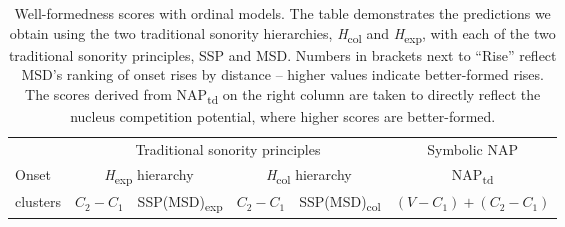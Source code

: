 \begin{sidewaystable}
\caption{\label{tab:ordinalscores} Well-formedness scores with ordinal models. The table demonstrates the predictions we obtain using the two traditional sonority hierarchies, \emph{H}\textsubscript{col} and \emph{H}\textsubscript{exp}, with each of the two traditional sonority principles, SSP and MSD. Numbers in brackets next to \enquote{Rise} reflect MSD's ranking of onset rises by distance -- higher values indicate better-formed rises. The scores derived from NAP\textsubscript{td} on the right column are taken to directly reflect the nucleus competition potential, where higher scores are better-formed.}
\begin{tabular}{lccccc}
\lsptoprule
& \multicolumn{4}{c}{Traditional sonority principles} & \multicolumn{1}{c}{Symbolic NAP}\\\cmidrule(lr){2-5}\cmidrule(lr){6-6}

Onset & \multicolumn{2}{c}{\emph{H}\textsubscript{exp} hierarchy} & \multicolumn{2}{c}{\emph{H}\textsubscript{col} hierarchy} & \multicolumn{1}{c}{{NAP\textsubscript{td}}}\\
clusters & \multicolumn{1}{c}{$C_2-C_1$} & \multicolumn{1}{c}{{SSP(MSD)\textsubscript{exp}}} & \multicolumn{1}{c}{$C_2-C_1$} & \multicolumn{1}{c}{{SSP(MSD)\textsubscript{col}}} & \multicolumn{1}{c}{$(V-C_1)+(C_2-C_1)$}\\


\end{tabular}
\end{sidewaystable}
